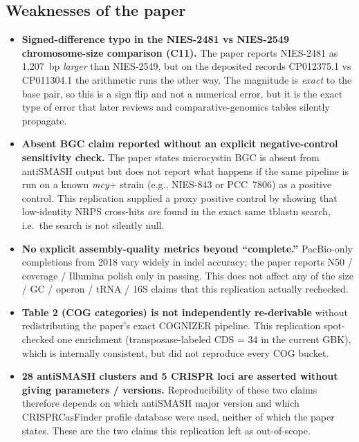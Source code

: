 \documentclass[11pt,letterpaper]{article}
\begin{document}
\subsection{Weaknesses of the paper}
\begin{itemize}[leftmargin=1.4em]
  \item \textbf{Signed-difference typo in the NIES-2481 vs NIES-2549 chromosome-size comparison (C11).} The paper reports NIES-2481 as 1{,}207~bp \emph{larger} than NIES-2549, but on the deposited records CP012375.1 vs CP011304.1 the arithmetic runs the other way. The magnitude is \emph{exact} to the base pair, so this is a sign flip and not a numerical error, but it is the exact type of error that later reviews and comparative-genomics tables silently propagate.
  \item \textbf{Absent BGC claim reported without an explicit negative-control sensitivity check.} The paper states microcystin BGC is absent from antiSMASH output but does not report what happens if the same pipeline is run on a known \emph{mcy}$+$ strain (e.g., NIES-843 or PCC~7806) as a positive control. This replication supplied a proxy positive control by showing that low-identity NRPS cross-hits \emph{are} found in the exact same tblastn search, i.e.\ the search is not silently null.
  \item \textbf{No explicit assembly-quality metrics beyond ``complete.''} PacBio-only completions from 2018 vary widely in indel accuracy; the paper reports N50 / coverage / Illumina polish only in passing. This does not affect any of the size / GC / operon / tRNA / 16S claims that this replication actually rechecked.
  \item \textbf{Table 2 (COG categories) is not independently re-derivable} without redistributing the paper's exact COGNIZER pipeline. This replication spot-checked one enrichment (transposase-labeled CDS = 34 in the current GBK), which is internally consistent, but did not reproduce every COG bucket.
  \item \textbf{28 antiSMASH clusters and 5 CRISPR loci are asserted without giving parameters / versions.} Reproducibility of these two claims therefore depends on which antiSMASH major version and which CRISPRCasFinder profile database were used, neither of which the paper states. These are the two claims this replication left as out-of-scope.
\end{itemize}
\end{document}
